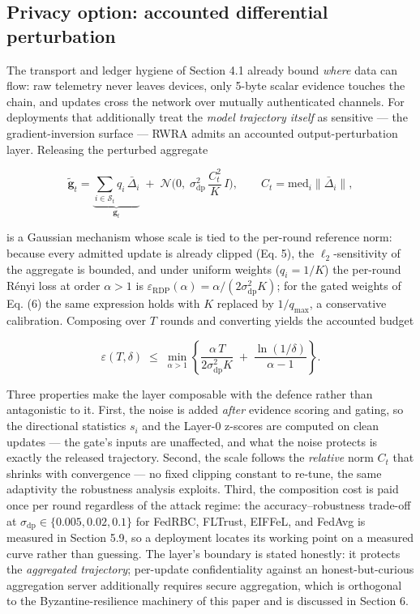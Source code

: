 \documentclass[cmc,article,submit,moreauthors,pdftex]{Definitions/tsp}
\begin{document}
\subsection{Privacy option: accounted differential perturbation}\label{sec:privacy-option-accounted-differential-perturbation}

The transport and ledger hygiene of Section 4.1 already bound \emph{where} data can flow: raw telemetry never leaves devices, only 5-byte scalar evidence touches the chain, and updates cross the network over mutually authenticated channels. For deployments that additionally treat the \emph{model trajectory itself} as sensitive --- the gradient-inversion surface --- RWRA admits an accounted output-perturbation layer. Releasing the perturbed aggregate

\begin{equation}
\tilde{\mathbf{g}}_t = \underbrace{\sum_{i \in \mathcal{S}_t} q_i\, \bar\Delta_i}_{\mathbf{g}_t} \;+\; \mathcal{N}\!\Big(0,\; \sigma_{\mathrm{dp}}^2\, \frac{C_t^2}{K}\, I\Big), \qquad C_t = \mathrm{med}_i \|\bar\Delta_i\|,
\tag{16}
\end{equation}

is a Gaussian mechanism whose scale is tied to the per-round reference norm: because every admitted update is already clipped (Eq. 5), the $\ell_2$-sensitivity of the aggregate is bounded, and under uniform weights ($q_i = 1/K$) the per-round Rényi loss at order $\alpha > 1$ is $\varepsilon_{\mathrm{RDP}}(\alpha) = \alpha/(2\sigma_{\mathrm{dp}}^2 K)$; for the gated weights of Eq. (6) the same expression holds with $K$ replaced by $1/q_{\max}$, a conservative calibration. Composing over $T$ rounds and converting yields the accounted budget

\begin{equation}
\varepsilon(T, \delta) \;\le\; \min_{\alpha > 1} \left\{ \frac{\alpha\, T}{2\sigma_{\mathrm{dp}}^2 K} \;+\; \frac{\ln(1/\delta)}{\alpha - 1} \right\}.
\tag{17}
\end{equation}

Three properties make the layer composable with the defence rather than antagonistic to it. First, the noise is added \emph{after} evidence scoring and gating, so the directional statistics $s_i$ and the Layer-0 z-scores are computed on clean updates --- the gate's inputs are unaffected, and what the noise protects is exactly the released trajectory. Second, the scale follows the \emph{relative} norm $C_t$ that shrinks with convergence --- no fixed clipping constant to re-tune, the same adaptivity the robustness analysis exploits. Third, the composition cost is paid once per round regardless of the attack regime: the accuracy--robustness trade-off at $\sigma_{\mathrm{dp}} \in \{0.005, 0.02, 0.1\}$ for FedRBC, FLTrust, EIFFeL, and FedAvg is measured in Section 5.9, so a deployment locates its working point on a measured curve rather than guessing. The layer's boundary is stated honestly: it protects the \emph{aggregated trajectory}; per-update confidentiality against an honest-but-curious aggregation server additionally requires secure aggregation, which is orthogonal to the Byzantine-resilience machinery of this paper and is discussed in Section 6.
\end{document}
